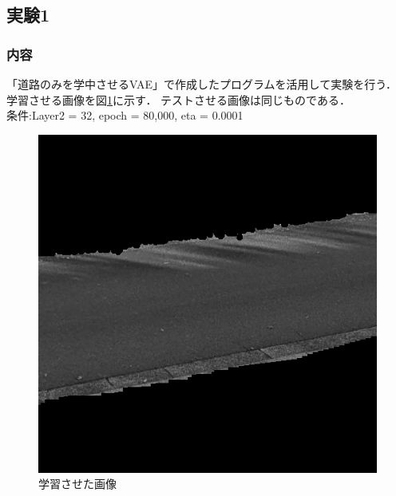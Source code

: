 \documentclass[twocolumn, a4j]{jsarticle}
\begin{document}
\subsection{実験1}
\subsubsection{内容}
「道路のみを学中させるVAE」で作成したプログラムを活用して実験を行う．
学習させる画像を図\ref{fig:4-1}に示す．
テストさせる画像は同じものである．
\\条件:Layer2 = 32, epoch = 80,000, eta = 0.0001
\begin{figure}[h]
  \begin{center}
    \includegraphics[width=0.48\columnwidth]{figure/road_only2.bmp}
  \end{center}
  \caption{学習させた画像}
  \label{fig:4-1}
\end{figure}
\end{document}
